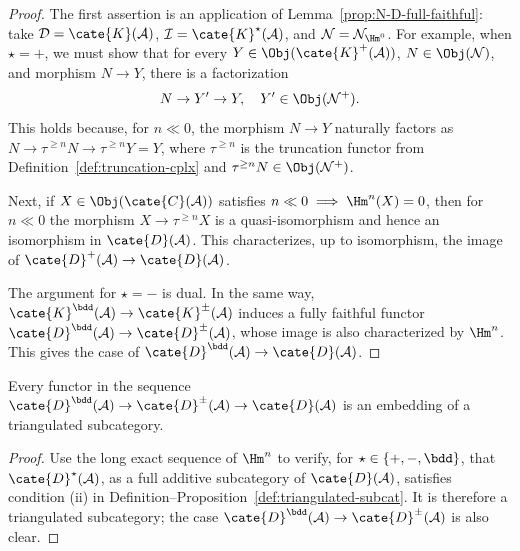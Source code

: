 \begin{proof}
	The first assertion is an application of
	Lemma~\ref{prop:N-D-full-faithful}: take
	$\mathcal{D} = \cate{K}(\mathcal{A})$,
	$\mathcal{I} = \cate{K}^\star(\mathcal{A})$, and
	$\mathcal{N} = \mathcal{N}_{\Hm^0}$. For example, when $\star = +$, we
	must show that for every
	$Y \in \Obj(\cate{K}^+(\mathcal{A}))$,
	$N \in \Obj(\mathcal{N})$, and morphism $N \to Y$, there is a
	factorization
	\[ N \to Y' \to Y, \quad Y' \in \Obj(\mathcal{N}^+). \]
	This holds because, for $n \ll 0$, the morphism $N \to Y$ naturally
	factors as $N \to \tau^{\geq n} N \to \tau^{\geq n} Y = Y$, where
	$\tau^{\geq n}$ is the truncation functor from
	Definition~\ref{def:truncation-cplx} and
	$\tau^{\geq n} N \in \Obj(\mathcal{N}^+)$.

	Next, if $X \in \Obj(\cate{C}(\mathcal{A}))$ satisfies
	$n \ll 0 \implies \Hm^n(X) = 0$, then for $n \ll 0$ the morphism
	$X \to \tau^{\geq n} X$ is a quasi-isomorphism and hence an isomorphism
	in $\cate{D}(\mathcal{A})$. This characterizes, up to isomorphism, the
	image of $\cate{D}^+(\mathcal{A}) \to \cate{D}(\mathcal{A})$.

	The argument for $\star = -$ is dual. In the same way,
	$\cate{K}^{\bdd}(\mathcal{A}) \to \cate{K}^\pm(\mathcal{A})$ induces a
	fully faithful functor
	$\cate{D}^{\bdd}(\mathcal{A}) \to \cate{D}^\pm(\mathcal{A})$, whose image
	is also characterized by $\Hm^n$. This gives the case of
	$\cate{D}^{\bdd}(\mathcal{A}) \to \cate{D}(\mathcal{A})$.
\end{proof}

\begin{corollary}
	Every functor in the sequence
	$\cate{D}^{\bdd}(\mathcal{A}) \to \cate{D}^{\pm}(\mathcal{A}) \to
	\cate{D}(\mathcal{A})$ is an embedding of a triangulated subcategory.
\end{corollary}

\begin{proof}
	Use the long exact sequence of $\Hm^n$ to verify, for
	$\star \in \{+, -, \bdd\}$, that
	$\cate{D}^\star(\mathcal{A})$, as a full additive subcategory of
	$\cate{D}(\mathcal{A})$, satisfies condition (ii) in
	Definition--Proposition~\ref{def:triangulated-subcat}. It is therefore a
	triangulated subcategory; the case
	$\cate{D}^{\bdd}(\mathcal{A}) \to \cate{D}^{\pm}(\mathcal{A})$ is also
	clear.
\end{proof}

